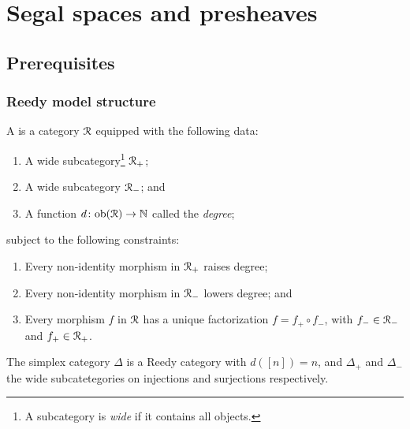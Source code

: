 \documentclass[main.tex]{subfiles}
\begin{document}
\chapter{Segal spaces and presheaves}
\label{ch:segal_spaces_and_presheaves}

\section{Prerequisites}
\label{sec:prerequisites}

\subsection{Reedy model structure}
\label{ssc:reedy_model_structure}

\begin{definition}
  A  is a category $\mathcal{R}$ equipped with the following data:
  \begin{enumerate}
    \item A wide subcategory\footnote{A subcategory is \emph{wide} if it contains all objects.} $\mathcal{R}_{+}$;

    \item A wide subcategory $\mathcal{R}_{-}$; and

    \item A function $d\colon \mathrm{ob}(\mathcal{R}) \to \mathbb{N}$ called the \emph{degree};
  \end{enumerate}
  subject to the following constraints:
  \begin{enumerate}
    \item Every non-identity morphism in $\mathcal{R}_{+}$ raises degree;

    \item Every non-identity morphism in $\mathcal{R}_{-}$ lowers degree; and

    \item Every morphism $f$ in $\mathcal{R}$ has a unique factorization $f = f_{+} \circ f_{-}$, with $f_{-} \in \mathcal{R}_{-}$ and $f_{+} \in \mathcal{R}_{+}$.
  \end{enumerate}
\end{definition}

\begin{example}
  The simplex category $\Delta$ is a Reedy category with $d([n]) = n$, and $\Delta_{+}$ and $\Delta_{-}$ the wide subcatetegories on injections and surjections respectively.
\end{example}
\end{document}
